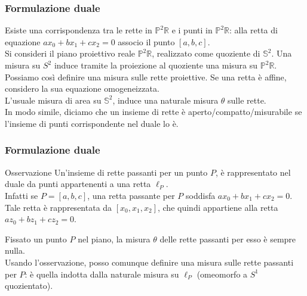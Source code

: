 \documentclass[11pt]{beamer} %
\newcommand{\R}{\mathbb{R}}
\renewcommand{\S}{\mathbb{S}}
\renewcommand{\P}{\mathbb{P}}
\newcommand{\<}{\langle}
\renewcommand{\>}{\rangle}
\theoremstyle{theorem}
\theoremstyle{theorem}
\theoremstyle{theorem}
\theoremstyle{theorem}
\theoremstyle{theorem}
\begin{document}


\begin{frame}
	\frametitle{Formulazione duale}
	Esiste una corrispondenza tra le rette in $\P^2 \R$ e i punti in $\P^2\R$: alla retta di equazione $ax_0+bx_1+cx_2=0$ associo il punto $[a,b,c]$.\\
	\pause
	Si consideri il piano proiettivo reale $\P^2 \R$, realizzato come quoziente di $\S^2$. Una misura su $S^2$ induce tramite la proiezione al quoziente una misura su $\P^2\R$.\\
	\pause
	Possiamo così definire una misura sulle rette proiettive. Se una retta è affine, considero la sua equazione omogeneizzata.\\
	L'usuale misura di area su $\S^2$, induce una naturale misura $\theta$ sulle rette.\\
	\pause
	In modo simile, diciamo che un insieme di rette è aperto/compatto/misurabile se l'insieme di punti corrispondente nel duale lo è.

	
\end{frame}

\begin{frame}
	\frametitle{Formulazione duale}
	
	\begin{block}{Osservazione}
		Un'insieme di rette passanti per un punto $P$, è rappresentato nel duale da punti appartenenti a una retta $\ell_P$.\\
		\pause
		Infatti se $P=[a,b,c]$, una retta passante per $P$ soddisfa $ax_0+bx_1+cx_2=0$. Tale retta è rappresentata da $[x_0,x_1,x_2]$, che quindi appartiene alla retta $az_0+bz_1+cz_2=0$.\\
	\end{block}
	
	Fissato un punto $P$ nel piano, la misura $\theta$ delle rette passanti per esso è sempre nulla.\\
	\pause
	Usando l'osservazione, posso comunque definire una misura sulle rette passanti per $P$: è quella indotta dalla naturale misura su $\ell_P$ (omeomorfo a $S^1$ quozientato).\\
\end{frame}	

	
\end{document}
